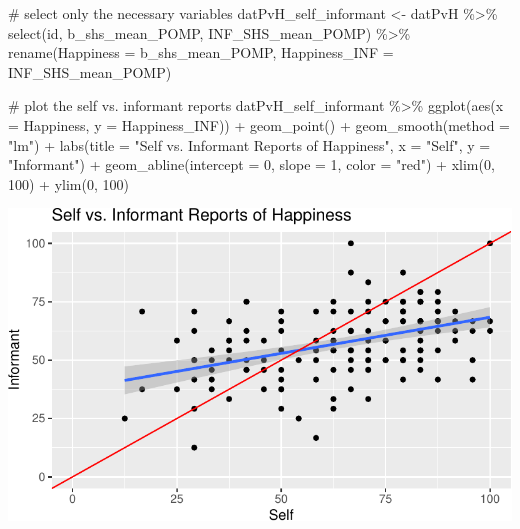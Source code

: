 \documentclass[
  letterpaper,
  DIV=11,
  numbers=noendperiod]{scrartcl}
\newenvironment{Shaded}{\begin{snugshade}}{\end{snugshade}}
\newcommand{\AttributeTok}[1]{\textcolor[rgb]{0.40,0.45,0.13}{#1}}
\newcommand{\CommentTok}[1]{\textcolor[rgb]{0.37,0.37,0.37}{#1}}
\newcommand{\DecValTok}[1]{\textcolor[rgb]{0.68,0.00,0.00}{#1}}
\newcommand{\FunctionTok}[1]{\textcolor[rgb]{0.28,0.35,0.67}{#1}}
\newcommand{\NormalTok}[1]{\textcolor[rgb]{0.00,0.23,0.31}{#1}}
\newcommand{\OtherTok}[1]{\textcolor[rgb]{0.00,0.23,0.31}{#1}}
\newcommand{\SpecialCharTok}[1]{\textcolor[rgb]{0.37,0.37,0.37}{#1}}
\newcommand{\StringTok}[1]{\textcolor[rgb]{0.13,0.47,0.30}{#1}}
\begin{document}
\begin{Shaded}
\begin{Highlighting}[]
\CommentTok{\# select only the necessary variables}
\NormalTok{datPvH\_self\_informant }\OtherTok{\textless{}{-}}\NormalTok{ datPvH }\SpecialCharTok{\%\textgreater{}\%} 
  \FunctionTok{select}\NormalTok{(id, b\_shs\_mean\_POMP, INF\_SHS\_mean\_POMP) }\SpecialCharTok{\%\textgreater{}\%}
  \FunctionTok{rename}\NormalTok{(}\AttributeTok{Happiness =}\NormalTok{ b\_shs\_mean\_POMP,}
         \AttributeTok{Happiness\_INF =}\NormalTok{ INF\_SHS\_mean\_POMP)}


\CommentTok{\# plot the self vs. informant reports}
\NormalTok{datPvH\_self\_informant }\SpecialCharTok{\%\textgreater{}\%} 
  \FunctionTok{ggplot}\NormalTok{(}\FunctionTok{aes}\NormalTok{(}\AttributeTok{x =}\NormalTok{ Happiness, }\AttributeTok{y =}\NormalTok{ Happiness\_INF)) }\SpecialCharTok{+}
  \FunctionTok{geom\_point}\NormalTok{() }\SpecialCharTok{+}
  \FunctionTok{geom\_smooth}\NormalTok{(}\AttributeTok{method =} \StringTok{"lm"}\NormalTok{) }\SpecialCharTok{+}
  \FunctionTok{labs}\NormalTok{(}\AttributeTok{title =} \StringTok{"Self vs. Informant Reports of Happiness"}\NormalTok{,}
       \AttributeTok{x =} \StringTok{"Self"}\NormalTok{,}
       \AttributeTok{y =} \StringTok{"Informant"}\NormalTok{) }\SpecialCharTok{+}
  \FunctionTok{geom\_abline}\NormalTok{(}\AttributeTok{intercept =} \DecValTok{0}\NormalTok{, }\AttributeTok{slope =} \DecValTok{1}\NormalTok{, }\AttributeTok{color =} \StringTok{"red"}\NormalTok{) }\SpecialCharTok{+}
  \FunctionTok{xlim}\NormalTok{(}\DecValTok{0}\NormalTok{, }\DecValTok{100}\NormalTok{) }\SpecialCharTok{+}
  \FunctionTok{ylim}\NormalTok{(}\DecValTok{0}\NormalTok{, }\DecValTok{100}\NormalTok{)}
\end{Highlighting}
\end{Shaded}

\includegraphics{purpose_vs_happiness_supplement_files/figure-pdf/self_vs_informant-1.pdf}
\end{document}
